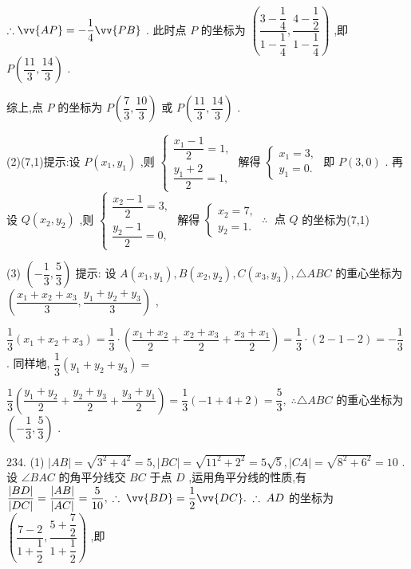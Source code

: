 $\therefore \vv{AP} =  - \dfrac{1}{4}\vv{PB}$ . 此时点 $P$ 的坐标为 $\left( {\dfrac{3 - \dfrac{1}{4}}{1 - \dfrac{1}{4}},\dfrac{4 - \dfrac{1}{2}}{1 - \dfrac{1}{4}}}\right)$ ,即 $P\left( {\dfrac{11}{3},\dfrac{14}{3}}\right)$ .

综上,点 $P$ 的坐标为 $P\left( {\dfrac{7}{3},\dfrac{10}{3}}\right)$ 或 $P\left( {\dfrac{11}{3},\dfrac{14}{3}}\right)$ .

(2)(7,1)提示:设 $P\left( {{x}_{1},{y}_{1}}\right)$ ,则 $\left\{  \begin{array}{l} \dfrac{{x}_{1} - 1}{2} = 1, \\  \dfrac{{y}_{1} + 2}{2} = 1, \end{array}\right.$ 解得 $\left\{  \begin{array}{l} {x}_{1} = 3, \\  {y}_{1} = 0. \end{array}\right.$ 即 $P\left( {3,0}\right)$ . 再设 $Q\left( {{x}_{2},{y}_{2}}\right)$ ,则 $\left\{  \begin{array}{l} \dfrac{{x}_{2} - 1}{2} = 3, \\  \dfrac{{y}_{2} - 1}{2} = 0, \end{array}\right.$ 解得 $\left\{  {\begin{array}{l} {x}_{2} = 7, \\  {y}_{2} = 1. \end{array}\;\therefore \;\text{ 点 }Q}\right.$ 的坐标为(7,1)

(3) $\left( {-\dfrac{1}{3},\dfrac{5}{3}}\right)$ 提示: 设 $A\left( {{x}_{1},{y}_{1}}\right) ,B\left( {{x}_{2},{y}_{2}}\right) ,C\left( {{x}_{3},{y}_{3}}\right) , \bigtriangleup  {ABC}$ 的重心坐标为 $\left( {\dfrac{{x}_{1} + {x}_{2} + {x}_{3}}{3},\dfrac{{y}_{1} + {y}_{2} + {y}_{3}}{3}}\right)$ ,

$\dfrac{1}{3}\left( {{x}_{1} + {x}_{2} + {x}_{3}}\right)  = \dfrac{1}{3} \cdot  \left( {\dfrac{{x}_{1} + {x}_{2}}{2} + \dfrac{{x}_{2} + {x}_{3}}{2} + \dfrac{{x}_{3} + {x}_{1}}{2}}\right)  = \dfrac{1}{3} \cdot  \left( {2 - 1 - 2}\right)  =  - \dfrac{1}{3}$ . 同样地, $\dfrac{1}{3}\left( {{y}_{1} + {y}_{2} + {y}_{3}}\right)  =$

$\dfrac{1}{3}\left( {\dfrac{{y}_{1} + {y}_{2}}{2} + \dfrac{{y}_{2} + {y}_{3}}{2} + \dfrac{{y}_{3} + {y}_{1}}{2}}\right)  = \dfrac{1}{3}\left( {-1 + 4 + 2}\right)  = \dfrac{5}{3},\;\therefore  \bigtriangleup  {ABC}$ 的重心坐标为 $\left( {-\dfrac{1}{3},\dfrac{5}{3}}\right)$ .

234. (1) $\left| {AB}\right|  = \sqrt{{3}^{2} + {4}^{2}} = 5,\left| {BC}\right|  = \sqrt{{11}^{2} + {2}^{2}} = 5\sqrt{5},\left| {CA}\right|  = \sqrt{{8}^{2} + {6}^{2}} = {10}$ . 设 $\angle {BAC}$ 的角平分线交 ${BC}$ 于点 $D$ ,运用角平分线的性质,有 $\dfrac{\left| BD\right| }{\left| DC\right| } = \dfrac{\left| AB\right| }{\left| AC\right| } = \dfrac{5}{10},\;\therefore \;\vv{BD} = \dfrac{1}{2}\vv{DC}.\;\therefore \;{AD}$ 的坐标为 $\left( {\dfrac{7 - 2}{1 + \dfrac{1}{2}},\dfrac{5 + \dfrac{7}{2}}{1 + \dfrac{1}{2}}}\right)$ ,即

